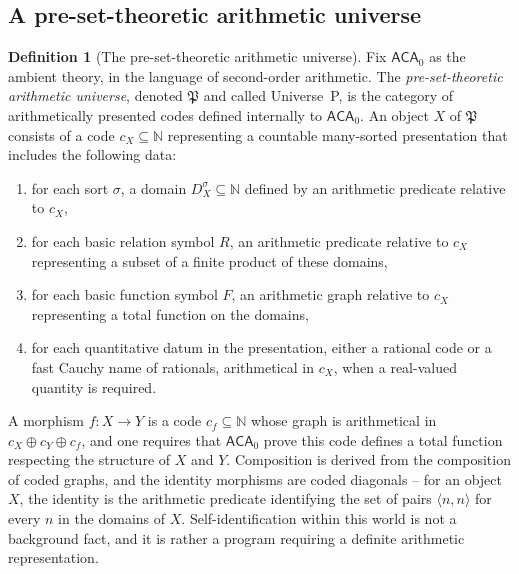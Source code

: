 \documentclass[10pt, reqno]{amsart}
\theoremstyle{plain}
\theoremstyle{definition}
\newtheorem{definition}[theorem]{Definition}
\theoremstyle{plain}
\begin{document}
\subsection{A pre-set-theoretic arithmetic universe}\label{subsec:PreSetArithmetic}

\begin{definition}[The pre-set-theoretic arithmetic universe]\label{def:UniverseP}
Fix $\mathsf{ACA}_0$ as the ambient theory, in the language of second-order arithmetic. The \emph{pre-set-theoretic arithmetic universe}, denoted $\mathfrak{P}$ and called Universe~P, is the category of arithmetically presented codes defined internally to $\mathsf{ACA}_0$. An object $X$ of $\mathfrak{P}$ consists of a code $c_X \subseteq \mathbb{N}$ representing a countable many-sorted presentation that includes the following data:
\begin{enumerate}
\item[(i)] for each sort $\sigma$, a domain $D_X^\sigma \subseteq \mathbb{N}$ defined by an arithmetic predicate relative to $c_X$,
\item[(ii)] for each basic relation symbol $R$, an arithmetic predicate relative to $c_X$ representing a subset of a finite product of these domains,
\item[(iii)] for each basic function symbol $F$, an arithmetic graph relative to $c_X$ representing a total function on the domains,
\item[(iv)] for each quantitative datum in the presentation, either a rational code or a fast Cauchy name of rationals, arithmetical in $c_X$, when a real-valued quantity is required.
\end{enumerate}
A morphism $f \colon X \to Y$ is a code $c_f \subseteq \mathbb{N}$ whose graph is arithmetical in $c_X \oplus c_Y \oplus c_f$, and one requires that $\mathsf{ACA}_0$ prove this code defines a total function respecting the structure of $X$ and $Y$. Composition is derived from the composition of coded graphs, and the identity morphisms are coded diagonals -- for an object $X$, the identity is the arithmetic predicate identifying the set of pairs $\langle n, n \rangle$ for every $n$ in the domains of $X$. Self-identification within this world is not a background fact, and it is rather a program requiring a definite arithmetic representation.
\end{definition}
\end{document}
